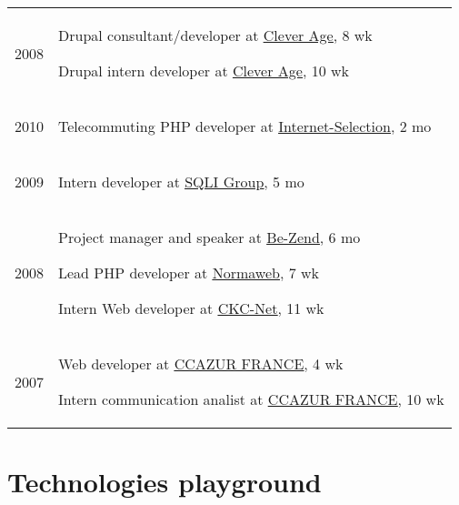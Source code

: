 \documentclass[letterpaper]{article}
\renewenvironment{itemize}{
    \begin{list}{}{
        \setlength{\leftmargin}{1.5em}
    }
}{
    \end{list}
}
\begin{document}
        \setlength{\tabcolsep}{0.6cm}
        \begin{tabular}{p{1cm}p{\textwidth}}
            \large{2008} & \begin{itemize}
                \item Drupal consultant/developer at \uline{\href{http://www.cleverage.com}{Clever Age}}, 8 wk
                \item Drupal intern developer at \uline{\href{http://www.cleverage.com}{Clever Age}}, 10 wk
            \end{itemize} \\
            \large{2010} &  \begin{itemize}
                \item Telecommuting PHP developer at \uline{\href{http://www.internet-selection.net}{Internet-Selection}}, 2 mo
            \end{itemize} \\
            \large{2009} &  \begin{itemize}
                \item Intern developer at \uline{\href{http://www.sqli.com}{SQLI Group}}, 5 mo
            \end{itemize} \\
            \large{2008} &  \begin{itemize}
                \item Project manager and speaker at \uline{\href{htt://www.be-zend.org}{Be-Zend}}, 6 mo
                \item Lead PHP developer at \uline{\href{http://www.normaweb.fr}{Normaweb}}, 7 wk
                \item Intern Web developer at \uline{\href{http://www.ckc-net.com}{CKC-Net}}, 11 wk
            \end{itemize} \\
            \large{2007} &  \begin{itemize}
                \item Web developer at \uline{\href{http://www.ccazur.com}{CCAZUR FRANCE}}, 4 wk
                \item Intern communication analist at \uline{\href{http://www.ccazur.com}{CCAZUR FRANCE}}, 10 wk
            \end{itemize}
        \end{tabular}
        
    \section*{Technologies playground}
        
\end{document}
